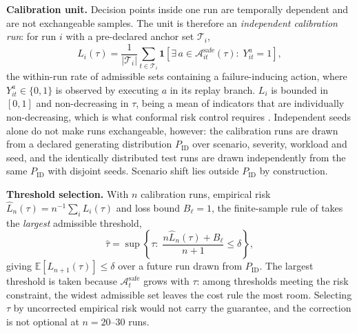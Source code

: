 \documentclass[journal]{IEEEtran}
\newcommand{\Aset}{\mathcal{A}}
\newcommand{\Asafe}{\Aset^{\mathrm{safe}}_{t}}
\newcommand{\Asafeit}{\Aset^{\mathrm{safe}}_{it}}
\begin{document}
\textbf{Calibration unit.} Decision points inside one run are temporally
dependent and are not exchangeable samples. The unit is therefore an
\emph{independent calibration run}: for run $i$ with a pre-declared anchor set
$\mathcal{T}_i$,
\begin{equation}
L_i(\tau)=\frac{1}{|\mathcal{T}_i|}\sum_{t\in\mathcal{T}_i}
\mathbf{1}\!\left[\exists\,a\in\Asafeit(\tau):\;Y^{a}_{it}=1\right],
\label{eq:loss}
\end{equation}
the within-run rate of admissible sets containing a failure-inducing action,
where $Y^{a}_{it}\in\{0,1\}$ is observed by executing $a$ in its replay branch.
$L_i$ is bounded in $[0,1]$ and non-decreasing in $\tau$, being a mean of
indicators that are individually non-decreasing, which is what conformal risk
control requires \cite{angelopoulos2024crc}. Independent seeds alone do not make
runs exchangeable, however: the calibration runs are drawn from a declared
generating distribution $P_{\mathrm{ID}}$ over scenario, severity, workload and
seed, and the identically distributed test runs are drawn independently from the
same $P_{\mathrm{ID}}$ with disjoint seeds. Scenario shift lies outside
$P_{\mathrm{ID}}$ by construction.

\textbf{Threshold selection.} With $n$ calibration runs, empirical risk
$\hat{L}_n(\tau)=n^{-1}\sum_i L_i(\tau)$ and loss bound $B_\ell=1$, the
finite-sample rule of \cite{angelopoulos2024crc} takes the \emph{largest}
admissible threshold,
\begin{equation}
\hat{\tau}=\sup\left\{\tau:\;
\frac{n\hat{L}_n(\tau)+B_\ell}{n+1}\le\delta\right\},
\label{eq:crc}
\end{equation}
giving $\mathbb{E}[L_{n+1}(\hat{\tau})]\le\delta$ over a future run drawn from
$P_{\mathrm{ID}}$. The largest threshold is taken because $\Asafe$ grows with $\tau$: among
thresholds meeting the risk constraint, the widest admissible set leaves the
cost rule the most room. Selecting $\tau$ by uncorrected empirical risk would
not carry the guarantee, and the correction is not optional at $n=20$--$30$
runs.
\end{document}
